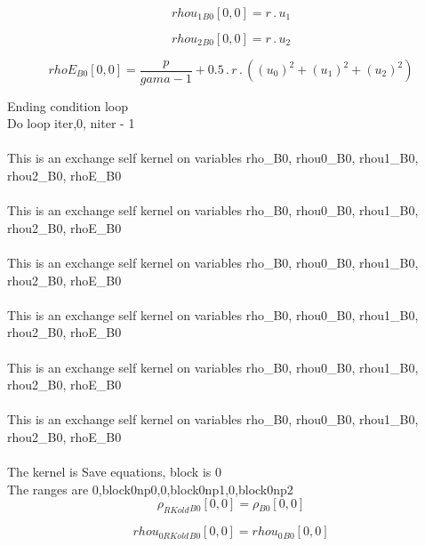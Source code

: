 \documentclass{article}
\begin{document}
\begin{dmath}{rhou_{1}{_{B0}}}[{0,0}] = r \,.\, u_{1}\end{dmath}

\begin{dmath}{rhou_{2}{_{B0}}}[{0,0}] = r \,.\, u_{2}\end{dmath}

\begin{dmath}{rhoE{_{B0}}}[{0,0}] = \frac{p}{gama - 1} + 0.5 \,.\, r \,.\, \left(\left(u_{0} \right)^{2} + \left(u_{1} \right)^{2} + \left(u_{2} \right)^{2}\right)\end{dmath}

\noindent Ending condition loop %
\\\noindent Do loop iter,0, niter - 1\\
\\\noindent This is an exchange self kernel on variables rho_B0, rhou0_B0, rhou1_B0, rhou2_B0, rhoE_B0\\\\\noindent This is an exchange self kernel on variables rho_B0, rhou0_B0, rhou1_B0, rhou2_B0, rhoE_B0\\\\\noindent This is an exchange self kernel on variables rho_B0, rhou0_B0, rhou1_B0, rhou2_B0, rhoE_B0\\\\\noindent This is an exchange self kernel on variables rho_B0, rhou0_B0, rhou1_B0, rhou2_B0, rhoE_B0\\\\\noindent This is an exchange self kernel on variables rho_B0, rhou0_B0, rhou1_B0, rhou2_B0, rhoE_B0\\\\\noindent This is an exchange self kernel on variables rho_B0, rhou0_B0, rhou1_B0, rhou2_B0, rhoE_B0\\\\\noindent The kernel is Save equations, block is 0\\\noindent The ranges are 0,block0np0,0,block0np1,0,block0np2\\\begin{dmath}{\rho_{RKold}{_{B0}}}[{0,0}] = {\rho{_{B0}}}[{0,0}]\end{dmath}

\begin{dmath}{rhou_{0 RKold}{_{B0}}}[{0,0}] = {rhou_{0}{_{B0}}}[{0,0}]\end{dmath}
\end{document}
